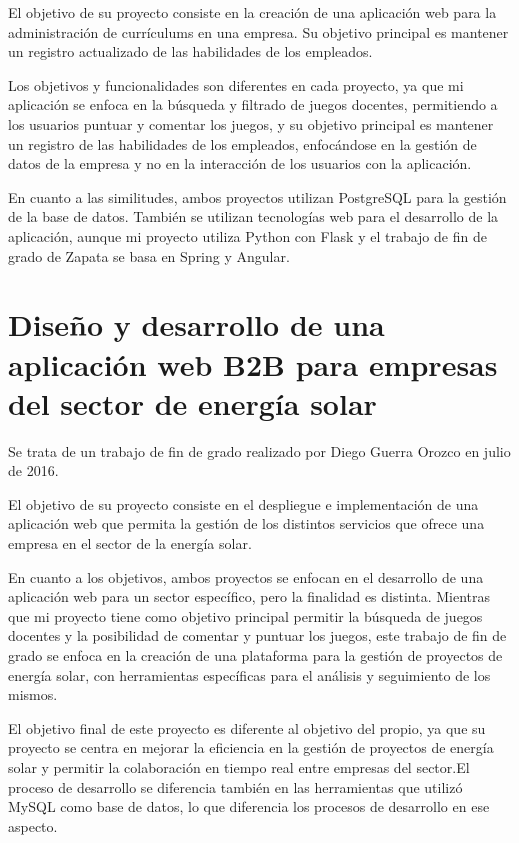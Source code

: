 El objetivo de su proyecto consiste en la creación de una aplicación web para la administración de currículums en una empresa. Su objetivo principal es mantener un registro actualizado de las habilidades de los empleados.

Los objetivos y funcionalidades son diferentes en cada proyecto, ya que mi aplicación se enfoca en la búsqueda y filtrado de juegos docentes, permitiendo a los usuarios puntuar y comentar los juegos, y su objetivo principal es mantener un registro de las habilidades de los empleados, enfocándose en la gestión de datos de la empresa y no en la interacción de los usuarios con la aplicación.

En cuanto a las similitudes, ambos proyectos utilizan PostgreSQL para la gestión de la base de datos. También se utilizan tecnologías web para el desarrollo de la aplicación, aunque mi proyecto utiliza Python con Flask y el trabajo de fin de grado de Zapata se basa en Spring y Angular.

\section{Diseño y desarrollo de una aplicación web B2B para empresas del sector de energía solar}
\cite{solar_Orozco} Se trata de un trabajo de fin de grado realizado por Diego Guerra Orozco en julio de 2016.

El objetivo de su proyecto consiste en el despliegue e implementación de una aplicación web que permita la gestión de los distintos servicios que ofrece una empresa en el sector de la energía solar.

En cuanto a los objetivos, ambos proyectos se enfocan en el desarrollo de una aplicación web para un sector específico, pero la finalidad es distinta. Mientras que mi proyecto tiene como objetivo principal permitir la búsqueda de juegos docentes y la posibilidad de comentar y puntuar los juegos, este trabajo de fin de grado se enfoca en la creación de una plataforma para la gestión de proyectos de energía solar, con herramientas específicas para el análisis y seguimiento de los mismos.

El objetivo final de este proyecto es diferente al objetivo del propio, ya que su proyecto se centra en mejorar la eficiencia en la gestión de proyectos de energía solar y permitir la colaboración en tiempo real entre empresas del sector.El proceso de desarrollo se diferencia también en las herramientas que utilizó MySQL como base de datos, lo que diferencia los procesos de desarrollo en ese aspecto.